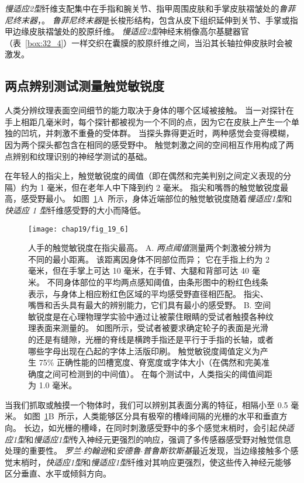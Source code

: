 \textit{慢适应2型}纤维支配集中在手指和腕关节、指甲周围皮肤和手掌皮肤褶皱处的\textit{鲁菲尼终末器}，。
\textit{鲁菲尼终末器}是长梭形结构，包含从皮下组织延伸到关节、手掌或指甲边缘皮肤褶皱处的胶原纤维。
\textit{慢适应2型}神经末梢像高尔基腱器官（表~\ref{box:32_4}）一样交织在囊膜的胶原纤维之间，当沿其长轴拉伸皮肤时会被激发。



\subsection{两点辨别测试测量触觉敏锐度}

人类分辨纹理表面空间细节的能力取决于身体的哪个区域被接触。
当一对探针在手上相距几毫米时，每个探针都被视为一个不同的点，因为它在皮肤上产生一个单独的凹坑，并刺激不重叠的受体群。
当探头靠得更近时，两种感觉会变得模糊，因为两个探头都包含在相同的感受野中。
触觉刺激之间的空间相互作用构成了两点辨别和纹理识别的神经学测试的基础。


在年轻人的指尖上，触觉敏锐度的阈值（即在偶然和完美判别之间定义表现的分隔）约为 1 毫米，但在老年人中下降到约 2 毫米。
指尖和嘴唇的触觉敏锐度最高，感受野最小。
如图~\ref{fig:19_6}A~所示，身体近端部位的触觉敏锐度随着\textit{慢适应1型}和\textit{快适应 1 型}纤维感受野的大小而降低。


\begin{figure}[htbp]
	\centering
	\texttt{[image: chap19/fig\_19\_6]}
	\caption{人手的触觉敏锐度在指尖最高。
		A. \textit{两点阈值}测量两个刺激被分辨为不同的最小距离。
		该距离因身体不同部位而异；
		它在手指上约为 2 毫米，但在手掌上可达 10 毫米，在手臂、大腿和背部可达 40 毫米。
		不同身体部位的平均两点感知阈值，由条形图中的粉红色线条表示，与身体上相应粉红色区域的平均感受野直径相匹配。
		指尖、嘴唇和舌头具有最大的辨别能力，它们具有最小的感受野\cite{weinstein1968intensive}。
		B. 空间敏锐度是在心理物理学实验中通过让被蒙住眼睛的受试者触摸各种纹理表面来测量的。
		如图所示，受试者被要求确定轮子的表面是光滑的还是有缝隙，光栅的脊线是横跨手指还是平行于手指的长轴，或者哪些字母出现在凸起的字体上活版印刷。
		触觉敏锐度阈值定义为产生 75\% 正确性能的凹槽宽度、脊宽度或字体大小（在偶然和完美准确度之间可检测到的中间值）。
		在每个测试中，人类指尖的阈值间距为 1.0 毫米\cite{johnson1981tactile}。}
	\label{fig:19_6}
\end{figure}


当我们抓取或触摸一个物体时，我们可以辨别其表面分离的特征，相隔小至 0.5 毫米。
如图~\ref{fig:19_6}B~所示，人类能够区分具有极窄的槽峰间隔的光栅的水平和垂直方向。
长边，如光栅的槽峰，在同时刺激感受野中的多个感觉末梢时，会引起\textit{快适应1型}和\textit{慢适应1型}传入神经元更强烈的响应，强调了多传感器感受野对触觉信息处理的重要性。
\textit{罗兰$\cdot$约翰逊}和\textit{安德鲁$\cdot$普鲁斯钦斯基}最近发现，当边缘接触多个感觉末梢时，\textit{快适应1型}和\textit{慢适应1型}纤维对其响应更强烈，使这些传入神经元能够区分垂直、水平或倾斜方向。


